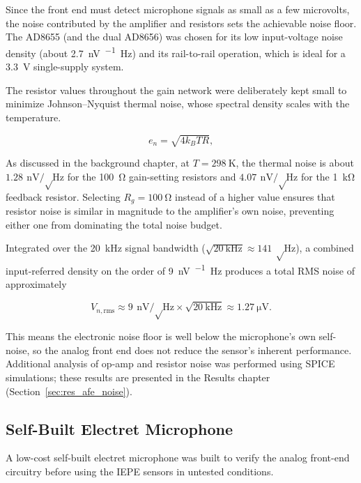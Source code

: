 Since the front end must detect microphone signals as small as a few microvolts, the noise contributed by the amplifier and resistors sets the achievable noise floor. The AD8655 (and the dual AD8656) was chosen for its low input-voltage noise density (about \SI{2.7}{\nano\volt\per\sqrt\hertz}) and its rail-to-rail operation, which is ideal for a \SI{3.3}{\volt} single-supply system.

The resistor values throughout the gain network were deliberately kept small to minimize Johnson--Nyquist thermal noise, whose spectral density scales with the temperature.

\begin{equation}
  e_n = \sqrt{4 k_B T R},
  \label{eq:afe_johnson}
\end{equation}

As discussed in the background chapter, at $T = \SI{298}{\kelvin}$, the thermal noise is about $\SI{1.28}{\nano\volt\per\sqrt\hertz}$ for the \SI{100}{\ohm} gain-setting resistors and $\SI{4.07}{\nano\volt\per\sqrt\hertz}$ for the \SI{1}{\kilo\ohm} feedback resistor. Selecting $R_g = \SI{100}{\ohm}$ instead of a higher value ensures that resistor noise is similar in magnitude to the amplifier's own noise, preventing either one from dominating the total noise budget.

Integrated over the \SI{20}{\kilo\hertz} signal bandwidth ($\sqrt{\SI{20}{\kilo\hertz}} \approx \SI{141}{\sqrt\hertz}$), a combined input-referred density on the order of \SI{9}{\nano\volt\per\sqrt\hertz} produces a total RMS noise of approximately

\begin{equation}
  V_{n,\text{rms}} \approx \SI{9}{\nano\volt\per\sqrt\hertz} \times \sqrt{\SI{20}{\kilo\hertz}} \approx \SI{1.27}{\micro\volt}.
  \label{eq:afe_noise_budget}
\end{equation}

This means the electronic noise floor is well below the microphone’s own self-noise, so the analog front end does not reduce the sensor’s inherent performance. Additional analysis of op-amp and resistor noise was performed using SPICE simulations; these results are presented in the Results chapter (Section~\ref{sec:res_afe_noise}).

\subsection{Self-Built Electret Microphone}
\label{sec:ref_mic}
A low-cost self-built electret microphone was built to verify the analog front-end circuitry before using the IEPE sensors in untested conditions.

